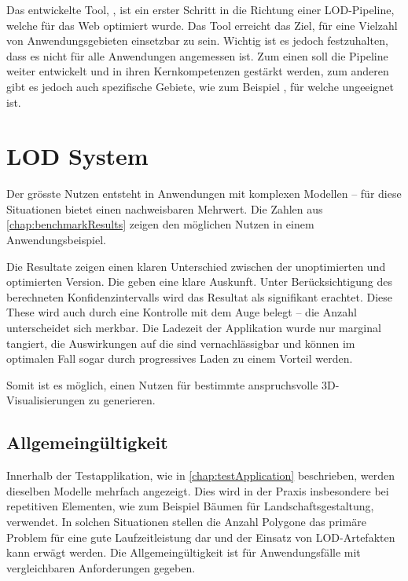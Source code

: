 Das entwickelte Tool, , ist ein erster Schritt in die Richtung einer LOD-Pipeline, welche für das Web optimiert wurde. Das Tool erreicht das Ziel, für eine Vielzahl von Anwendungsgebieten einsetzbar zu sein. Wichtig ist es jedoch festzuhalten, dass es nicht für alle Anwendungen angemessen ist. Zum einen soll die Pipeline weiter entwickelt und in ihren Kernkompetenzen gestärkt werden, zum anderen gibt es jedoch auch spezifische Gebiete, wie zum Beispiel , für welche  ungeeignet ist.

\section{LOD System}

Der grösste Nutzen entsteht in Anwendungen mit komplexen Modellen – für diese Situationen bietet  einen nachweisbaren Mehrwert. Die Zahlen aus \autoref{chap:benchmarkResults} zeigen den möglichen Nutzen in einem Anwendungsbeispiel.

Die Resultate zeigen einen klaren Unterschied zwischen der unoptimierten und optimierten Version. Die  geben eine klare Auskunft. Unter Berücksichtigung des berechneten Konfidenzintervalls wird das Resultat als signifikant erachtet. Diese These wird auch durch eine Kontrolle mit dem Auge belegt – die Anzahl  unterscheidet sich merkbar. Die Ladezeit der Applikation wurde nur marginal tangiert, die Auswirkungen auf die  sind vernachlässigbar und können im optimalen Fall sogar durch progressives Laden zu einem Vorteil werden.

Somit ist es möglich, einen Nutzen für bestimmte anspruchsvolle 3D-Visualisierungen zu generieren.

\subsection{Allgemeingültigkeit}

Innerhalb der Testapplikation, wie in \autoref{chap:testApplication} beschrieben, werden dieselben Modelle mehrfach angezeigt. Dies wird in der Praxis insbesondere bei repetitiven Elementen, wie zum Beispiel Bäumen für Landschaftsgestaltung, verwendet. In solchen Situationen stellen die Anzahl Polygone das primäre Problem für eine gute Laufzeitleistung dar und der Einsatz von LOD-Artefakten kann erwägt werden. Die Allgemeingültigkeit ist für Anwendungsfälle mit vergleichbaren Anforderungen gegeben.

